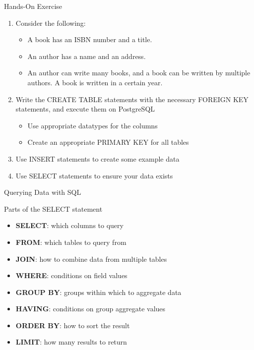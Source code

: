 \documentclass[ignorenonframetext,xcolor=x11names]{beamer}
\begin{document}
\begin{frame}{Hands-On Exercise}
\small
\begin{enumerate}
  \item Consider the following:
	\begin{itemize}
	  \item A book has an ISBN number and a title. 
	  \item An author has a name and an address. 
	  \item An author can write many books, and a book can be written by multiple authors. A book is written in a certain year.
	\end{itemize}
  \item Write the CREATE TABLE statements with the necessary FOREIGN KEY statements, and execute them on PostgreSQL
  \begin{itemize}
    \item Use appropriate datatypes for the columns
    \item Create an appropriate PRIMARY KEY for all tables
  \end{itemize}
  \item Use INSERT statements to create some example data
  \item Use SELECT statements to ensure your data exists
\end{enumerate}
\end{frame}

\begin{frame}{Querying Data with SQL}
\begin{block}{Parts of the SELECT statement}
  \begin{itemize}
     \item \textbf{SELECT}: which columns to query
     \item \textbf{FROM}: which tables to query from
     \item \textbf{JOIN}: how to combine data from multiple tables
     \item \textbf{WHERE}: conditions on field values
     \item \textbf{GROUP BY}: groups within which to aggregate data
     \item \textbf{HAVING}: conditions on group aggregate values
     \item \textbf{ORDER BY}: how to sort the result
     \item \textbf{LIMIT}: how many results to return
   \end{itemize}
\end{block}
\end{frame}
\end{document}
